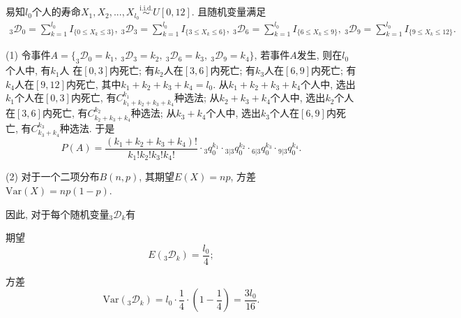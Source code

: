 \documentclass[lang=cn,10pt]{elegantbook}
\begin{document}
\begin{solution}
    易知$l_{0}$个人的寿命$X_{1},X_{2},...,X_{l_{0}}\stackrel{\text{i.i.d.}}{\sim}U[0,12]$. 且随机变量满足
    \begin{align*}
        {}_{3}\mathscr D _{0}=\sum^{l_{0}}_{k=1}I_{\{0\leq X_k \leq 3\}},~{}_{3}\mathscr D _{3}=\sum^{l_{0}}_{k=1}I_{\{3\leq X_k \leq 6\}},~{}_{3}\mathscr D _{6}=\sum^{l_{0}}_{k=1}I_{\{6\leq X_k \leq 9\}},~{}_{3}\mathscr D _{9}=\sum^{l_{0}}_{k=1}I_{\{9\leq X_k \leq 12\}}.
    \end{align*}

    (1) 令事件$A=\{_{3}\mathscr D _{0}=k_{1},\ _{3}\mathscr D _{3}=k_{2},\ _{3}\mathscr D _{6}=k_{3},\ _{3}\mathscr D _{9}=k_{4}\}$, 若事件$A$发生, 则在$l_{0}$个人中, 有$k_{1}$人
    在$[0,3]$内死亡; 有$k_{2}$人在$[3,6]$内死亡; 有$k_{3}$人在$[6,9]$内死亡; 有$k_{4}$人在$[9,12]$内死亡, 其中$k_{1}+k_{2}+k_{3}+k_{4}=l_{0}.$ 从$k_{1}+k_{2}+k_{3}+k_{4}$个人中, 选出$k_{1}$个人在$[0,3]$内死亡, 有$C_{k_{1}+k_{2}+k_{3}+k_{4}}^{k_{1}}$种选法; 从$k_{2}+k_{3}+k_{4}$个人中, 选出$k_{2}$个人在$[3,6]$内死亡, 有$C_{k_{2}+k_{3}+k_{4}}^{k_{2}}$种选法; 从$k_{3}+k_{4}$个人中, 选出$k_{3}$个人在$[6,9]$内死亡, 有$C_{k_{3}+k_{4}}^{k_{3}}$种选法. 于是
    $$
        P(A)=\frac{(k_{1}+k_{2}+k_{3}+k_{4})!}{k_{1}!k_{2}!k_{3}!k_{4}!}\cdot {}_{3}q_{0}^{k_{1}}\cdot {}_{3|3}q_{0}^{k_{2}}\cdot {}_{6|3}q_{0}^{k_{3}}\cdot {}_{9|3}q_{0}^{k_{4}}.
    $$

    (2) 对于一个二项分布$B(n, p)$, 其期望$E(X) = np$, 方差$\text{Var}(X) = np(1-p)$.

    因此, 对于每个随机变量$_{3}\mathscr D_{k}$有

    期望 $$E(_{3}\mathscr D_{k}) = \frac{l_0}{4};$$

    方差 $$\text{Var}(_{3}\mathscr D_{k}) = l_0 \cdot \frac{1}{4} \cdot \left(1 - \frac{1}{4}\right) = \frac{3l_0}{16}.$$


\end{solution}
\end{document}
